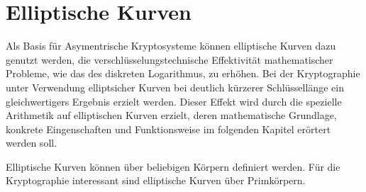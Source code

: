 

\chapter{Elliptische Kurven}
Als Basis für Asymentrische Kryptosysteme können elliptische Kurven dazu genutzt werden, die verschlüsselungstechnische Effektivität mathematischer Probleme, wie das des diskreten Logarithmus, zu erhöhen. Bei der Kryptographie unter Verwendung elliptsicher Kurven bei deutlich kürzerer Schlüssellänge ein gleichwertigers Ergebnis erzielt werden. Dieser Effekt wird durch die spezielle Arithmetik auf elliptischen Kurven erzielt, deren mathematische Grundlage, konkrete Eingenschaften und Funktionsweise im folgenden Kapitel erörtert werden soll.

Elliptische Kurven können über beliebigen Körpern definiert werden. Für die Kryptographie interessant sind elliptische Kurven über Primkörpern.






